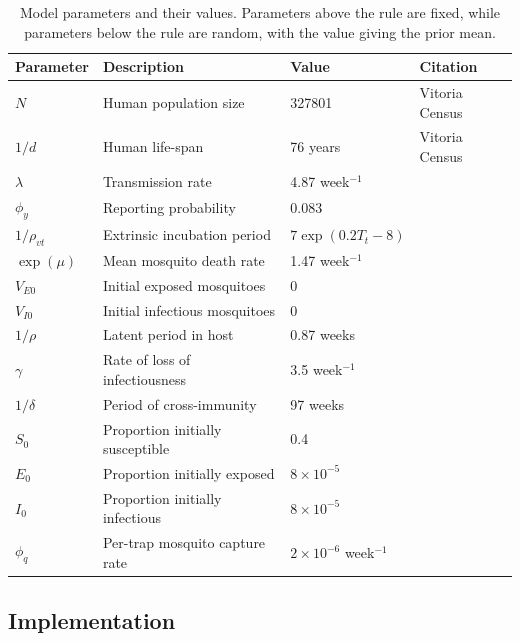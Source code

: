 \documentclass[10pt,letterpaper]{article}
\begin{document}
\begin{table}[!ht]
\label{parameters}
\begin{adjustwidth}{-2.25in}{0in} 
\begin{center}
\caption{Model parameters and their values.  Parameters above the rule are fixed, while parameters below the rule are random, with the value giving the prior mean.}
\begin{tabular}{llll}
Parameter & Description & Value & Citation\\
\hline
$N$ & Human population size & 327801 & Vitoria Census\\
$1/d$ & Human life-span & 76 years & Vitoria Census\\
$\lambda$ & Transmission rate & 4.87 week$^{-1}$ & \cite{Scott2000}\\
$\phi_y$ & Reporting probability & 0.083 & \cite{Silva2016}\\
$1/\rho_{vt}$ & Extrinsic incubation period & $7\exp \left( 0.2 T_t - 8 \right)$ & \cite{Chan2012}\\
$\exp(\mu)$ & Mean mosquito death rate & 1.47 week$^{-1}$ & \cite{Brady2013} \\
$V_{E0}$ & Initial exposed mosquitoes &  0 & \\
$V_{I0}$ & Initial infectious mosquitoes & 0 & \\
\hline
$1/\rho$ & Latent period in host & 0.87 weeks  & \cite{Chan2012}\\
$\gamma$ & Rate of loss of infectiousness & 3.5 week$^{-1}$ & \cite{Nguyet2013}\\
$1/\delta$ & Period of cross-immunity & 97 weeks &  \cite{Reich2013}\\
$S_0$ & Proportion initially susceptible & 0.4 & \cite{Cardoso2011a} \\
$E_0$ & Proportion initially exposed & $8\times 10 ^ {-5}$ & \\
$I_0$ & Proportion initially infectious & $8\times 10 ^ {-5}$ & \\
$\phi_q$ & Per-trap mosquito capture rate & $2 \times 10^{-6}$ week$^{-1}$ & 
\end{tabular}
\end{center}
\end{adjustwidth}
\end{table}

\subsection*{Implementation}
\end{document}
